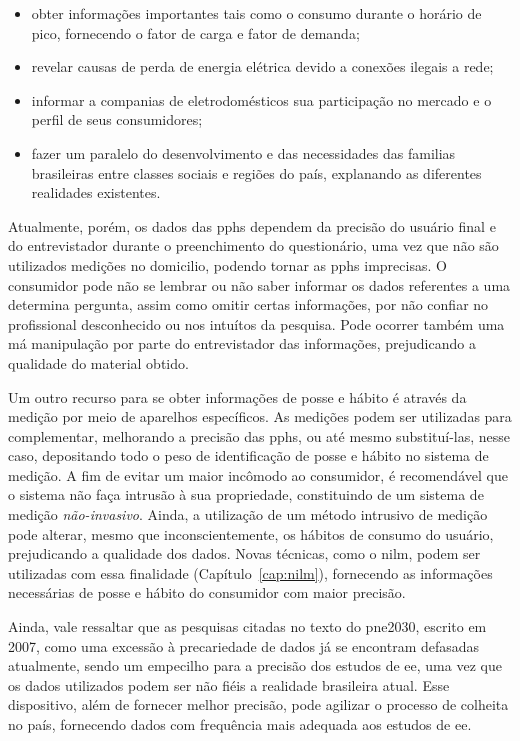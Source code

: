 \begin{itemize}
\item obter informações importantes tais como o consumo durante o horário de pico,
fornecendo o fator de carga e fator de demanda;
\item revelar causas de perda de energia elétrica devido a conexões ilegais a
rede;
\item informar a companias de eletrodomésticos sua participação no mercado e 
o perfil de seus consumidores;
\item fazer um paralelo do desenvolvimento e das necessidades das familias 
brasileiras entre classes sociais e regiões do país, explanando as 
diferentes realidades existentes.
\end{itemize}

Atualmente, porém, os dados das \glspl{pph} dependem da precisão do
usuário final e do entrevistador durante o preenchimento do
questionário, uma vez que não são utilizados medições no domicilio,
podendo tornar as \glspl{pph} imprecisas. O consumidor pode não se
lembrar ou não saber informar os dados referentes a uma determina
pergunta, assim como omitir certas informações, por não confiar no
profissional desconhecido ou nos intuítos da pesquisa.  Pode ocorrer
também uma má manipulação por parte do entrevistador das informações,
prejudicando a qualidade do material obtido.

Um outro recurso para se obter informações de posse e hábito é através
da medição por meio de aparelhos específicos. As medições podem ser
utilizadas para complementar, melhorando a precisão das \glspl{pph},
ou até mesmo substituí-las, nesse caso, depositando todo o peso de
identificação de posse e hábito no sistema de medição. A fim de evitar
um maior incômodo ao consumidor, é recomendável que o sistema não faça
intrusão à sua propriedade, constituindo de um sistema de medição
\emph{não-invasivo}. Ainda, a utilização de um método intrusivo de
medição pode alterar, mesmo que inconscientemente, os hábitos de
consumo do usuário, prejudicando a qualidade dos dados.  Novas
técnicas, como o \gls{nilm}, podem ser utilizadas com essa
finalidade (Capítulo~\ref{cap:nilm}), fornecendo as informações
necessárias de posse e hábito do consumidor com maior precisão. 

Ainda, vale ressaltar que as pesquisas citadas no texto do
\gls{pne2030}, escrito em 2007, como uma excessão à precariedade de
dados já se encontram defasadas atualmente, sendo um empecilho para a 
precisão dos estudos de \gls{ee}, uma vez que os dados utilizados
podem ser não fiéis a realidade brasileira atual.  Esse dispositivo,
além de fornecer melhor precisão, pode agilizar o processo de colheita
no país, fornecendo dados com frequência mais adequada aos estudos de
\gls{ee}. 
